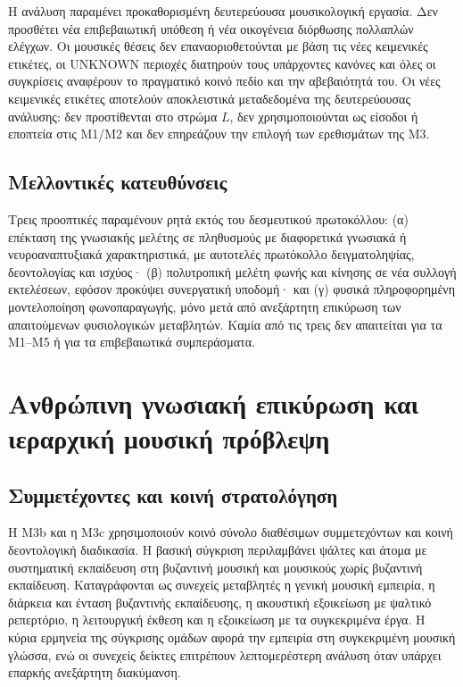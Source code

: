 \documentclass[11pt,a4paper]{article}
\begin{document}
Η ανάλυση παραμένει προκαθορισμένη δευτερεύουσα μουσικολογική εργασία. Δεν προσθέτει νέα επιβεβαιωτική υπόθεση ή νέα οικογένεια διόρθωσης πολλαπλών ελέγχων. Οι μουσικές θέσεις δεν επαναοριοθετούνται με βάση τις νέες κειμενικές ετικέτες, οι UNKNOWN περιοχές διατηρούν τους υπάρχοντες κανόνες και όλες οι συγκρίσεις αναφέρουν το πραγματικό κοινό πεδίο και την αβεβαιότητά του. Οι νέες κειμενικές ετικέτες αποτελούν αποκλειστικά μεταδεδομένα της δευτερεύουσας ανάλυσης: δεν προστίθενται στο στρώμα $L$, δεν χρησιμοποιούνται ως είσοδοι ή εποπτεία στις M1/M2 και δεν επηρεάζουν την επιλογή των ερεθισμάτων της M3.


\subsection{Μελλοντικές κατευθύνσεις}

Τρεις προοπτικές παραμένουν ρητά εκτός του δεσμευτικού πρωτοκόλλου: (α) επέκταση της γνωσιακής μελέτης σε πληθυσμούς με διαφορετικά γνωσιακά ή νευροαναπτυξιακά χαρακτηριστικά, με αυτοτελές πρωτόκολλο δειγματοληψίας, δεοντολογίας και ισχύος· (β) πολυτροπική μελέτη φωνής και κίνησης σε νέα συλλογή εκτελέσεων, εφόσον προκύψει συνεργατική υποδομή· και (γ) φυσικά πληροφορημένη μοντελοποίηση φωνοπαραγωγής, μόνο μετά από ανεξάρτητη επικύρωση των απαιτούμενων φυσιολογικών μεταβλητών. Καμία από τις τρεις δεν απαιτείται για τα M1--M5 ή για τα επιβεβαιωτικά συμπεράσματα.


\section{Ανθρώπινη γνωσιακή επικύρωση και ιεραρχική μουσική πρόβλεψη}\label{app:human}

\subsection{Συμμετέχοντες και κοινή στρατολόγηση}\label{app:human-participants}

Η M3b και η M3c χρησιμοποιούν κοινό σύνολο διαθέσιμων συμμετεχόντων και κοινή δεοντολογική διαδικασία. Η βασική σύγκριση περιλαμβάνει ψάλτες και άτομα με συστηματική εκπαίδευση στη βυζαντινή μουσική και μουσικούς χωρίς βυζαντινή εκπαίδευση. Καταγράφονται ως συνεχείς μεταβλητές η γενική μουσική εμπειρία, η διάρκεια και ένταση βυζαντινής εκπαίδευσης, η ακουστική εξοικείωση με ψαλτικό ρεπερτόριο, η λειτουργική έκθεση και η εξοικείωση με τα συγκεκριμένα έργα. Η κύρια ερμηνεία της σύγκρισης ομάδων αφορά την εμπειρία στη συγκεκριμένη μουσική γλώσσα, ενώ οι συνεχείς δείκτες επιτρέπουν λεπτομερέστερη ανάλυση όταν υπάρχει επαρκής ανεξάρτητη διακύμανση.
\end{document}
